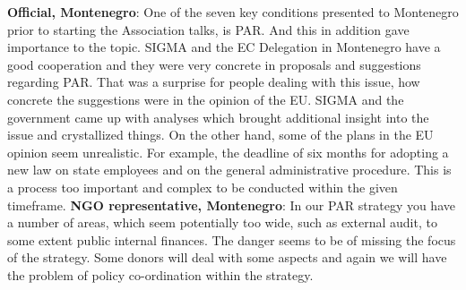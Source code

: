 \textbf{Official, Montenegro}: One of the seven key conditions presented to Montenegro prior to starting the Association talks, is PAR. And this in addition gave importance to the topic. SIGMA and the EC Delegation in Montenegro have a good cooperation and they were very concrete in proposals and suggestions regarding PAR. That was a surprise for people dealing with this issue, how concrete the suggestions were in the opinion of the EU. SIGMA and the government came up with analyses which brought additional insight into the issue and crystallized things. On the other hand, some of the plans in the EU opinion seem unrealistic. For example, the deadline of six months for adopting a new law on state employees and on the general administrative procedure. This is a process too important and complex to be conducted within the given timeframe.
\textbf{NGO representative, Montenegro}: In our PAR strategy you have a number of areas, which seem potentially too wide, such as external audit, to some extent public internal finances. The danger seems to be of missing the focus of the strategy. Some donors will deal with some aspects and again we will have the problem of policy co-ordination within the strategy. %
